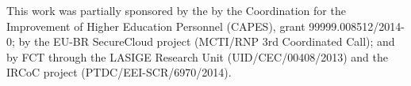 \documentclass[journal]{IEEEtran}
\begin{document}
This work was partially sponsored by the by the Coordination for the Improvement of Higher Education Personnel (CAPES), grant 99999.008512/2014-0; by the EU-BR SecureCloud project (MCTI/RNP 3rd Coordinated Call); and by FCT through the LASIGE Research Unit (UID/CEC/00408/2013) and the IRCoC project (PTDC/EEI-SCR/6970/2014).

% 
% 
% 
\end{document}
